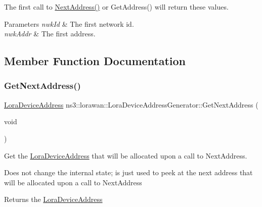 The first call to \hyperlink{classns3_1_1lorawan_1_1LoraDeviceAddressGenerator_a1d6c7015540abd13289e69dfcd0f6701}{Next\+Address()} or Get\+Address() will return these values.


\begin{DoxyParams}{Parameters}
{\em nwk\+Id} & The first network id. \\
\hline
{\em nwk\+Addr} & The first address. \\
\hline
\end{DoxyParams}


\subsection{Member Function Documentation}
\mbox{\label{classns3_1_1lorawan_1_1LoraDeviceAddressGenerator_aded9a1ced7deb2449cfcd07291bc4281}} 
\subsubsection{\texorpdfstring{Get\+Next\+Address()}{GetNextAddress()}}
{\footnotesize\ttfamily \hyperlink{classns3_1_1lorawan_1_1LoraDeviceAddress}{Lora\+Device\+Address} ns3\+::lorawan\+::\+Lora\+Device\+Address\+Generator\+::\+Get\+Next\+Address (\begin{DoxyParamCaption}\item[{void}]{ }\end{DoxyParamCaption})}

Get the \hyperlink{classns3_1_1lorawan_1_1LoraDeviceAddress}{Lora\+Device\+Address} that will be allocated upon a call to Next\+Address.

Does not change the internal state; is just used to peek at the next address that will be allocated upon a call to Next\+Address

\begin{DoxyReturn}{Returns}
the \hyperlink{classns3_1_1lorawan_1_1LoraDeviceAddress}{Lora\+Device\+Address} 
\end{DoxyReturn}
\mbox{\label{classns3_1_1lorawan_1_1LoraDeviceAddressGenerator_a1d6c7015540abd13289e69dfcd0f6701}} 
